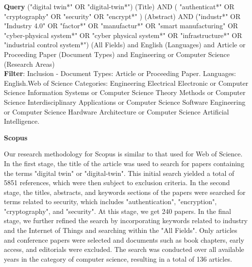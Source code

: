 \begin{tcolorbox}[colback=black!5!white, sharp corners=all, colframe=white!95!black]
\textbf{Query}
\tcblower
("digital twin*" OR "digital-twin*") (Title) AND ( "authenticat*" OR "cryptography" OR "security" OR "encrypt*" ) (Abstract) AND ("industr*" OR "Industry 4.0" OR "factor*" OR "manufactur*" OR "smart manufacturing" OR "cyber-physical system*" OR "cyber physical system*" OR "infrastructure*" OR "industrial control system*") (All Fields) and English (Languages) and Article or Proceeding Paper (Document Types) and Engineering or Computer Science (Research Areas) \\


\textbf{Filter}: Inclusion - Document Types: Article or Proceeding Paper. Languages: English.Web of Science Categories: Engineering Electrical Electronic or Computer Science Information Systems or Computer Science Theory Methods or Computer Science Interdisciplinary Applications or Computer Science Software Engineering or Computer Science Hardware Architecture or Computer Science Artificial Intelligence.

\end{tcolorbox}



\textbf{Scopus}

Our research methodology for Scopus is similar to that used for Web of Science. In the first stage, the title of the article was used to search for papers containing the terms "digital twin" or "digital-twin". This initial search yielded a total of 5851 references, which were then subject to exclusion criteria. In the second stage, the titles, abstracts, and keywords sections of the papers were searched for terms related to security, which includes  "authentication", "encryption", "cryptography", and "security". At this stage, we get 240 papers. In the final stage,  we further refined the search by incorporating keywords related to industry and the Internet of Things and searching within the "All Fields". Only articles and conference papers were selected and documents such as book chapters, early access, and editorials were excluded. The search was conducted over all available years in the category of computer science, resulting in a total of 136 articles.

